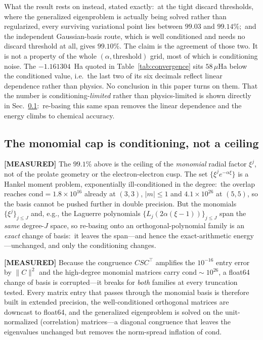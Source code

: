 \documentclass[aps,pra,twocolumn,superscriptaddress,longbibliography]{revtex4-2}
\begin{document}
What the result rests on instead, stated exactly:\ at the tight discard
thresholds, where the generalized eigenproblem is actually being solved rather
than regularized, every surviving variational point lies between $99.03$ and
$99.14\%$;\ and the independent Gaussian-basis route, which is well
conditioned and needs no discard threshold at all, gives $99.10\%$.  The claim
is the agreement of those two.  It is not a property of the whole
$(\alpha, \mathrm{threshold})$ grid, most of which is conditioning noise.  The $-1.161304$~Ha quoted in
Table~\ref{tab:convergence} sits $58\,\mu$Ha below the conditioned
value, i.e.\ the last two of its six decimals reflect linear
dependence rather than physics.  No conclusion in this paper turns
on them.  That the number is conditioning-\emph{limited} rather than
physics-limited is shown directly in Sec.~\ref{sec:recondition}:\
re-basing this same span removes the linear dependence and the energy
climbs to chemical accuracy.

\subsection{The monomial cap is conditioning, not a ceiling}
\label{sec:recondition}

\textbf{[MEASURED]} The $99.1\%$ above is the ceiling of the
\emph{monomial} radial factor $\xi^j$, not of the prolate geometry or
the electron-electron cusp.  The set $\{\xi^j e^{-\alpha\xi}\}$ is a
Hankel moment problem, exponentially ill-conditioned in the degree:\
the overlap reaches $\mathrm{cond} = 1.8\times10^{16}$ already at
$(3,3)$, $|m|\le1$ and $4.1\times10^{26}$ at $(5,5)$, so the basis
cannot be pushed further in double precision.  But the monomials
$\{\xi^j\}_{j\le J}$ and, e.g., the Laguerre polynomials
$\{L_j(2\alpha(\xi-1))\}_{j\le J}$ span the \emph{same} degree-$J$
space, so re-basing onto an orthogonal-polynomial family is an
\emph{exact} change of basis:\ it leaves the span---and hence the
exact-arithmetic energy---unchanged, and only the conditioning changes.

\textbf{[MEASURED]} Because the congruence $C S C^{\!\top}$ amplifies
the $10^{-16}$ entry error by $\|C\|^2$ and the high-degree monomial
matrices carry $\mathrm{cond}\sim10^{26}$, a float64 change of basis is
corrupted---it breaks for \emph{both} families at every truncation
tested.  Every matrix entry that passes through the monomial basis is
therefore built in extended precision,
the well-conditioned orthogonal matrices are downcast to float64, and
the generalized eigenproblem is solved on the unit-normalized
(correlation) matrices---a diagonal congruence that leaves the
eigenvalues unchanged but removes the norm-spread inflation of
$\mathrm{cond}$.
\end{document}
